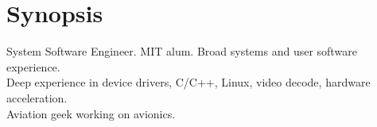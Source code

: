 \section{Synopsis}
System Software Engineer. MIT alum. Broad systems and user software experience. \\
Deep experience in device drivers, C/C++, Linux, video decode, hardware acceleration. \\
Aviation geek working on avionics.
